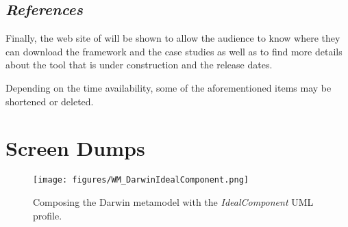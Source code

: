 \subsection{\em References}
Finally, the web site of \name{} will be shown to allow the
audience to know where they can download the framework and the case
studies as well as to find more details about the tool that is under
construction and the release dates.


Depending on the time availability, some of the aforementioned items
may be shortened or deleted.


\section{Screen Dumps}\label{sec:dumps}
%
%
\begin{figure*}[ht]
    \begin{center}
    \texttt{[image: figures/WM\_DarwinIdealComponent.png]}
    \caption{Composing the Darwin metamodel with the \textit{IdealComponent} UML profile.}\label{fig:WM_DarwinIdealComponent}
    \end{center}
\end{figure*}
%

